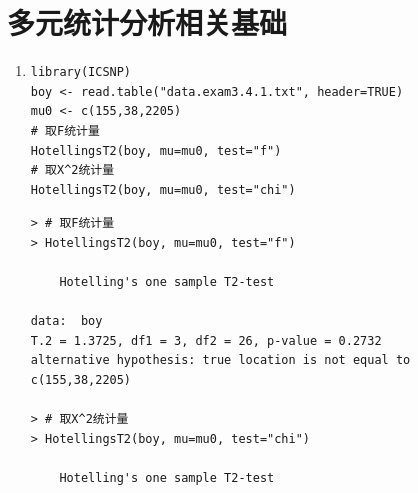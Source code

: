 \section{多元统计分析相关基础}
    \begin{enumerate}
        \item
        \code
\begin{lstlisting}
library(ICSNP)
boy <- read.table("data.exam3.4.1.txt", header=TRUE)
mu0 <- c(155,38,2205)
# 取F统计量
HotellingsT2(boy, mu=mu0, test="f")
# 取X^2统计量
HotellingsT2(boy, mu=mu0, test="chi")
\end{lstlisting}
        \out
\begin{lstlisting}
> # 取F统计量
> HotellingsT2(boy, mu=mu0, test="f")

	Hotelling's one sample T2-test

data:  boy
T.2 = 1.3725, df1 = 3, df2 = 26, p-value = 0.2732
alternative hypothesis: true location is not equal to c(155,38,2205)

> # 取X^2统计量
> HotellingsT2(boy, mu=mu0, test="chi")

	Hotelling's one sample T2-test


\end{lstlisting}
\end{enumerate}

